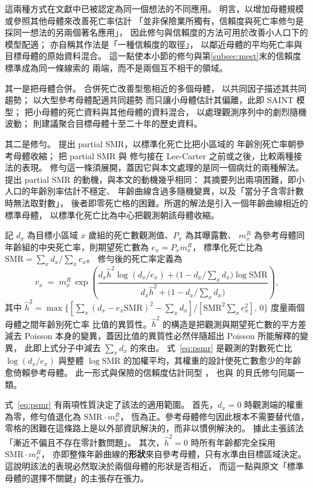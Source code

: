 \documentclass[UTF8, fontset=macnew, a4paper, 12pt]{ctexart}
\begin{document}
這兩種方式在文獻中已被認定為同一個想法的不同應用。
\citet{wang2018} 明言，以增加母體規模或參照其他母體來改善死亡率估計
「並非保險業所獨有，信賴度與死亡率修勻是採同一想法的另兩個著名應用」，
因此修勻與信賴度的方法可用於改善小人口下的模型配適；
\citet{ahcan2014} 亦自稱其作法是「一種信賴度的取徑」，
以鄰近母體的平均死亡率與目標母體的原始資料混合。
這一點使本小節的修勻與第\ref{subsec:mest}末的信賴度標準成為同一條線索的
兩端，而不是兩個互不相干的領域。

其一是把母體合併。\citet{lilee2005} 合併死亡改善型態相近的多個母體，
以共同因子描述其共同趨勢；\citet{jarner2011} 以大型參考母體配適共同趨勢
而只讓小母體估計其偏離，此即 SAINT 模型；
\citet{ahcan2014} 把小母體的死亡資料與其他母體的資料混合，
以處理觀測序列中的劇烈隨機波動；
\citet{wang2018} 則建議聚合目標母體十至二十年的歷史資料。

其二是修勻。\citet{lee2003} 提出 partial SMR，以標準化死亡比把小區域的
年齡別死亡率朝參考母體收縮；\citet{yue2019} 把 partial SMR 與
\citet{whittaker1923} 修勻接在 Lee-Carter 之前或之後，比較兩種接法的表現。
修勻這一條須展開，蓋因它與本文處理的是同一個病灶的兩種解法。
\citet{lee2003} 提出 partial SMR 的動機，與本文的動機幾乎相同：
其摘要列出兩項困難，即小人口的年齡別率估計不穩定、
年齡曲線含過多隨機變異，以及「當分子含零計數時無法取對數」，
後者即零死亡格的困難。所選的解法是引入一個年齡曲線相近的標準母體，
以標準化死亡比為中心把觀測朝該母體收縮。

記 $d_x$ 為目標小區域 $x$ 歲組的死亡數觀測值、$P_x$ 為其曝露數、
$m^R_x$ 為參考母體同年齡組的中央死亡率，則期望死亡數為 $e_x=P_x m^R_x$，
標準化死亡比為 $\mathrm{SMR}=\sum_x d_x\big/\sum_x e_x$。
修勻後的死亡率定義為
\begin{equation}\label{eq:psmr}
v_x \;=\; m^R_x\,\exp\!\left(
\frac{d_x\hat h^2\log(d_x/e_x)+\bigl(1-d_x/\textstyle\sum_x d_x\bigr)\log \mathrm{SMR}}
     {d_x\hat h^2+\bigl(1-d_x/\textstyle\sum_x d_x\bigr)}\right),
\end{equation}
其中 $\hat h^2=\max\bigl\{[\sum_x(d_x-e_x\mathrm{SMR})^2-\sum_x d_x]
\big/[\mathrm{SMR}^2\sum_x e_x^2],\,0\bigr\}$ 度量兩個母體之間年齡別死亡率
比值的異質性。$\hat h^2$ 的構造是把觀測與期望死亡數的平方差減去 Poisson
本身的變異，蓋因比值的異質性必然伴隨超出 Poisson 所能解釋的變異，
此即上式分子中減去 $\sum_x d_x$ 的來由。
式~\eqref{eq:psmr} 是觀測的對數死亡比 $\log(d_x/e_x)$ 與整體
$\log\mathrm{SMR}$ 的加權平均，其權重的設計使死亡數愈少的年齡愈倚賴參考母體。
此一形式與保險的信賴度估計同型 \citep{klugman2012}，
也與 \citet{kimeldorf1967} 的貝氏修勻同屬一類。

式~\eqref{eq:psmr} 有兩項性質決定了該法的適用範圍。
首先，$d_x=0$ 時觀測端的權重為零，修勻值退化為 $\mathrm{SMR}\cdot m^R_x$，
恆為正。參考母體修勻因此根本不需要替代值，
零格的困難在這條路上是以外部資訊解決的，而非以慣例解決的。
\citet{lee2003} 據此主張該法「漸近不偏且不存在零計數問題」。
其次，$\hat h^2=0$ 時所有年齡都完全採用 $\mathrm{SMR}\cdot m^R_x$，
亦即整條年齡曲線的\textbf{形狀}來自參考母體，只有水準由目標區域決定。
這說明該法的表現必然取決於兩個母體的形狀是否相近，
而這一點與原文「標準母體的選擇不關鍵」的主張存在張力。
\end{document}
